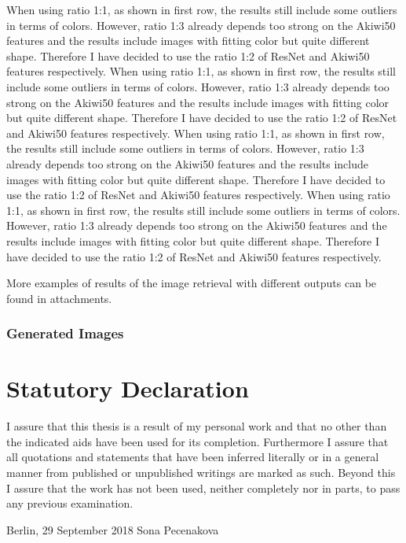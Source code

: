 \documentclass[12pt]{report}
\begin{document}
When using ratio 1:1, as shown in first row, the results still include some outliers in terms of colors. However, ratio 1:3 already depends too strong on the Akiwi50 features and the results include images with fitting color but quite different shape. Therefore I have decided to use the ratio 1:2 of ResNet and Akiwi50 features respectively.
When using ratio 1:1, as shown in first row, the results still include some outliers in terms of colors. However, ratio 1:3 already depends too strong on the Akiwi50 features and the results include images with fitting color but quite different shape. Therefore I have decided to use the ratio 1:2 of ResNet and Akiwi50 features respectively.
When using ratio 1:1, as shown in first row, the results still include some outliers in terms of colors. However, ratio 1:3 already depends too strong on the Akiwi50 features and the results include images with fitting color but quite different shape. Therefore I have decided to use the ratio 1:2 of ResNet and Akiwi50 features respectively.
When using ratio 1:1, as shown in first row, the results still include some outliers in terms of colors. However, ratio 1:3 already depends too strong on the Akiwi50 features and the results include images with fitting color but quite different shape. Therefore I have decided to use the ratio 1:2 of ResNet and Akiwi50 features respectively.

More examples of results of the image retrieval with different outputs can be found in attachments.

\subsection{Generated Images}

\appendix
\newpage
\listoffigures

\newpage
\listoftables

\newpage

\renewcommand{\refname}{Bibliography}

\clearpage


\pagestyle{plain}
\chapter*{Statutory Declaration}
I assure that this thesis is a result of my personal work and that no other than the indicated aids have been used for its completion. Furthermore I assure that all quotations and statements that have been inferred literally or in a general manner from published or unpublished writings are marked as such. Beyond this I assure that the work has not been used, neither completely nor in parts, to pass any previous examination.

\vspace{2cm}
\noindent
Berlin, 29 September 2018
\hfill
Sona Pecenakova
\clearpage
\end{document}
